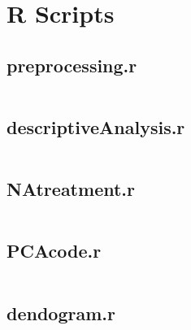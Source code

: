 

\section{R Scripts}%
\label{sec:r_scripts}

\newcommand{\mintedfile}[1]{
    \subsection{#1}%
    \label{sub:#1}
    \inputminted{r}{../../analysis/#1}
    \pagebreak
}


\mintedfile{preprocessing.r}
\mintedfile{descriptiveAnalysis.r}
\mintedfile{NAtreatment.r}
\mintedfile{PCAcode.r}
\mintedfile{dendogram.r}

